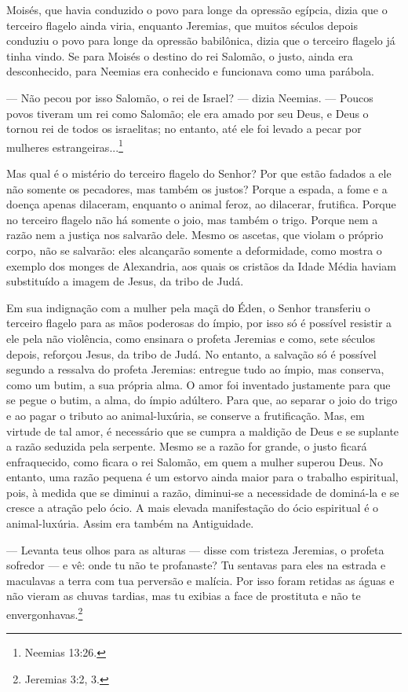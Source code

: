 Moisés, que havia conduzido o povo para longe da opressão egípcia, dizia
que o terceiro flagelo ainda viria, enquanto Jeremias, que muitos
séculos depois conduziu o povo para longe da opressão babilônica, dizia
que o terceiro flagelo já tinha vindo. Se para Moisés o destino do rei
Salomão, o justo, ainda era desconhecido, para Neemias era conhecido e
funcionava como uma parábola.

--- Não pecou por isso Salomão, o rei de Israel? --- dizia Neemias. ---
Poucos povos tiveram um rei como Salomão; ele era amado por seu Deus, e
Deus o tornou rei de todos os israelitas; no entanto, até ele foi levado
a pecar por mulheres estrangeiras...\footnote{Neemias 13:26.}

Mas qual é o mistério do terceiro flagelo do Senhor? Por que estão
fadados a ele não somente os pecadores, mas também os justos? Porque a
espada, a fome e a doença apenas dilaceram, enquanto o animal feroz, ao
dilacerar, frutifica. Porque no terceiro flagelo não há somente o joio,
mas também o trigo. Porque nem a razão nem a justiça nos salvarão dele.
Mesmo os ascetas, que violam o próprio corpo, não se salvarão: eles
alcançarão somente a deformidade, como mostra o exemplo dos monges de
Alexandria, aos quais os cristãos da Idade Média haviam substituído a
imagem de Jesus, da tribo de Judá.

Em sua indignação com a mulher pela maçã dо Éden, o Senhor transferiu o
terceiro flagelo para as mãos poderosas do ímpio, por isso só é possível
resistir a ele pela não violência, como ensinara o profeta Jeremias e
como, sete séculos depois, reforçou Jesus, da tribo de Judá. No entanto,
a salvação só é possível segundo a ressalva do profeta Jeremias:
entregue tudo ao ímpio, mas conserva, como um butim, a sua própria alma.
O amor foi inventado justamente para que se pegue o butim, a alma, do
ímpio adúltero. Para que, ao separar o joio do trigo e ao pagar o
tributo ao animal-luxúria, se conserve a frutificação. Mas, em virtude
de tal amor, é necessário que se cumpra a maldição de Deus e se suplante
a razão seduzida pela serpente. Mesmo se a razão for grande, o justo
ficará enfraquecido, como ficara o rei Salomão, em quem a mulher superou
Deus. No entanto, uma razão pequena é um estorvo ainda maior para o
trabalho espiritual, pois, à medida que se diminui a razão, diminui-se a
necessidade de dominá-la e se cresce a atração pelo ócio. A mais elevada
manifestação do ócio espiritual é o animal-luxúria. Assim era também na
Antiguidade.

--- Levanta teus olhos para as alturas --- disse com tristeza Jeremias,
o profeta sofredor --- e vê: onde tu não te profanaste? Tu sentavas para
eles na estrada e maculavas a terra com tua perversão e malícia. Por
isso foram retidas as águas e não vieram as chuvas tardias, mas tu
exibias a face de prostituta e não te envergonhavas.\footnote{Jeremias
  3:2, 3.}

